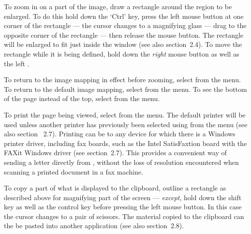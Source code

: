 
To zoom in on a part of the image, draw a rectangle around the region
to be enlarged. %
To do this %
hold down the `Ctrl' key, press the left mouse button at 
one corner of the rectangle --- 
the cursor changes to a magnifying glass --- 
drag to the opposite corner of the rectangle ---  
then release the mouse button.
The rectangle %
will be enlarged to fit just inside the window (see also section~2.4). 
To move the rectangle while it is being defined, 
hold down the {\it right\/} mouse button as well as the left%
.

To return to the image mapping in effect before zooming, 
select  from the  menu.
To return to the default image mapping, 
select  from the  menu.
To see the bottom of the page instead of the top, select
 from the  menu.

To print the page being viewed, select  from the
 menu.  
The default printer will be used unless another printer has previously been
selected using  from the  menu
(see also section ~2.7).
%
Printing can be to any device for which there is a Windows printer driver,
including fax boards, such as the Intel SatisFaxtion{\TM} board
with the FAXit{\TM} Windows driver (see section~2.7).
This provides a convenient way of sending a letter %
directly from {\DVIWindo}, without the loss of resolution encountered
when scanning a printed document in a fax machine.

To copy a part of what is displayed to the clipboard, outline a
rectangle as described above for magnifying part of the screen ---
{\it except}, hold down the shift key as well as the control key before
pressing the left mouse button.  In this case the cursor changes to
a pair of scissors.  The material copied to the clipboard can the be
pasted into another application (see also section~2.8).

